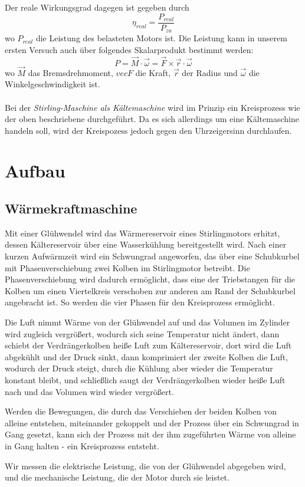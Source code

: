 \documentclass[12pt,a4paper,twopage]{article}
\begin{document}
Der reale Wirkungsgrad dagegen ist gegeben durch
$$\eta_{real}=\frac{P_{real}}{P_{zu}}$$
wo $P_{real}$ die Leistung des belasteten Motors ist. Die Leistung kann in unserem ersten Versuch auch über folgendes Skalarprodukt bestimmt werden:
$$P=\vec{M}\cdot\vec{\omega}=\vec{F}\times\vec{r}\cdot\vec{\omega}$$
wo $\vec{M}$ das Bremsdrehmoment, $vec{F}$ die Kraft, $\vec{r}$ der Radius und $\vec{\omega}$ die Winkelgeschwindigkeit ist.\\
\\
Bei der \textit{Stirling-Maschine als Kältemaschine} wird im Prinzip ein Kreisprozess wie der oben beschriebene durchgeführt. Da es sich allerdings um eine Kältemaschine handeln soll, wird der Kreispozess jedoch gegen den Uhrzeigersinn durchlaufen.

\section{Aufbau}
\subsection{Wärmekraftmaschine}
Mit einer Glühwendel wird das Wärmereservoir eines Stirlingmotors erhitzt, dessen Kältereservoir über eine Wasserkühlung bereitgestellt wird. Nach einer kurzen Aufwärmzeit wird ein Schwungrad angeworfen, das über eine Schubkurbel mit Phasenverschiebung zwei Kolben im Stirlingmotor betreibt. Die Phasenverschiebung wird dadurch ermöglicht, dass eine der Triebstangen für die Kolben um einen Viertelkreis verschoben zur anderen am Rand der Schubkurbel angebracht ist. So werden die vier Phasen für den Kreisprozess ermöglicht. 

Die Luft nimmt Wärme von der Glühwendel auf und das Volumen im Zylinder wird zugleich vergrößert, wodurch sich seine Temperatur nicht ändert, dann schiebt der Verdrängerkolben heiße Luft zum Kältereservoir, dort wird die Luft abgekühlt und der Druck sinkt, dann komprimiert der zweite Kolben die Luft, wodurch der Druck steigt, durch die Kühlung aber wieder die Temperatur konstant bleibt, und schließlich saugt der Verdrängerkolben wieder heiße Luft nach und das Volumen wird wieder vergrößert. 

Werden die Bewegungen, die durch das Verschieben der beiden Kolben von alleine entstehen, miteinander gekoppelt und der Prozess über ein Schwungrad in Gang gesetzt, kann sich der Prozess mit der ihm zugeführten Wärme von alleine in Gang halten - ein Kreisprozess entsteht.

Wir messen die elektrische Leistung, die von der Glühwendel abgegeben wird, und die mechanische Leistung, die der Motor durch sie leistet.
\end{document}
